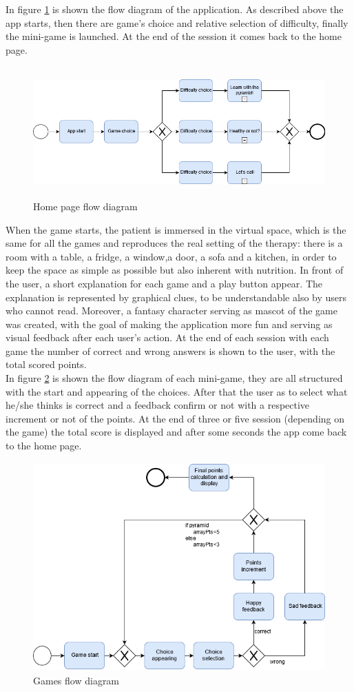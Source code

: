 In figure \ref{fig:homeflow} is shown the flow diagram of the application. As described above the app starts, then there are game's choice and relative selection of difficulty, finally the mini-game is launched. At the end of the session it comes back to the home page.\\
\begin{figure}[H]
\centering
\includegraphics[width=15cm, height=5cm]{immagini/flow1.png}
\caption{Home page flow diagram}\label{fig:homeflow}
\end{figure}
When the game starts, the patient is immersed in the virtual space, which is the same for all the games and reproduces the real setting of the therapy: there is a room with a table, a fridge, a window,a door, a sofa and a kitchen, in order to keep the space as simple as possible but also inherent with nutrition. In front of the user, a short explanation for each game and a play button appear. The explanation is represented by graphical clues, to be understandable also by users who cannot read. Moreover, a fantasy character serving as mascot of the game was created, with the goal of making the application more fun and serving as visual feedback after each user's action. At the end of each session with each game the number of correct and wrong answers is shown to the user, with the total scored points.\\
In figure \ref{fig:gameflow} is shown the flow diagram of each mini-game, they are all structured with the start and appearing of the choices. After that the user as to select what he/she thinks is correct and a feedback confirm or not with a respective increment or not of the points. At the end of three or five session (depending on the game) the total score is displayed and after some seconds the app come back to the home page.\\
\begin{figure}[H]
\centering
\includegraphics[width=15cm, height=8cm]{immagini/flow2.png}
\caption{Games flow diagram}\label{fig:gameflow}
\end{figure}

